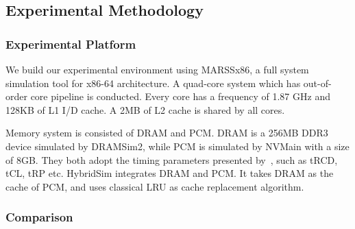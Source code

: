 \documentclass[conference]{IEEEtran}
\begin{document}

\subsection{Experimental Methodology}\label{sec:evaluation_methodology}

\subsubsection{Experimental Platform}

We build our experimental environment using MARSSx86\cite{patel_marss_2011}, a full system simulation tool for x86-64 architecture. %
A quad-core system which has out-of-order core pipeline is conducted.
Every core has a frequency of 1.87 GHz and 128KB of L1 I/D cache.
A 2MB of L2 cache is shared by all cores.

Memory system is consisted of DRAM and PCM\@.
DRAM is a 256MB DDR3 device simulated by DRAMSim2\cite{rosenfeld_dramsim2_2011}, while PCM is simulated by NVMain\cite{poremba_nvmain_2015} with a size of 8GB\@.
They both adopt the timing parameters presented by~\cite{lee_architecting_2009}, such as tRCD, tCL, tRP etc.
HybridSim\cite{stevens_integrated_2013} integrates DRAM and PCM\@.
It takes DRAM as the cache of PCM, and uses classical LRU as cache replacement algorithm.

\subsubsection{Comparison}
\end{document}
